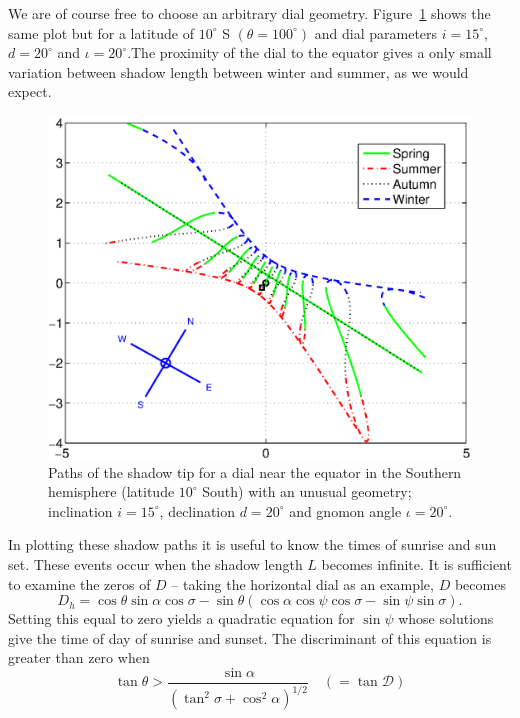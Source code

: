 \documentclass[12pt]{article}
\begin{document}
We are of course free to choose an arbitrary dial geometry. Figure~\ref{arbDial} shows the same plot but for a latitude of $10^\circ$ S $(\theta = 100^\circ)$ and dial parameters $i = 15^\circ$, $d = 20^\circ$ and $\iota = 20^\circ$.The proximity of the dial to the equator gives a only small variation between shadow length between winter and summer, as we would expect.
%
\begin{figure}[ht!]
\centering
\includegraphics[width=13cm]{figs/figure8.eps} 
\caption{Paths of the shadow tip for a dial near the equator in the Southern hemisphere (latitude $10^\circ$ South) with an unusual geometry; inclination $i = 15^\circ$, declination $d = 20^\circ$ and gnomon angle $\iota = 20^\circ$.\label{arbDial}}
\end{figure}
%
In plotting these shadow paths it is useful to know the times of sunrise and sun set. These events occur when the shadow length $L$ becomes infinite. It is sufficient to examine the zeros of $D$ -- taking the horizontal dial as an example, $D$ becomes
%
\begin{equation} \label{D_h}
D_h = \cos\theta\sin\alpha\cos\sigma - \sin\theta( \cos\alpha\cos\psi\cos\sigma - \sin\psi\sin\sigma).
\end{equation}
%
Setting this equal to zero yields a quadratic equation for $\sin\psi$ whose solutions give the time of day of sunrise and sunset. The discriminant of this equation is greater than zero when
%
\begin{equation} \label{tantheta_crit}
\tan\theta > \frac{\sin\alpha}{(\tan^2\sigma + \cos^2\alpha)^{1/2}} \quad ( = \tan\mathcal{D})
\end{equation}
\end{document}
